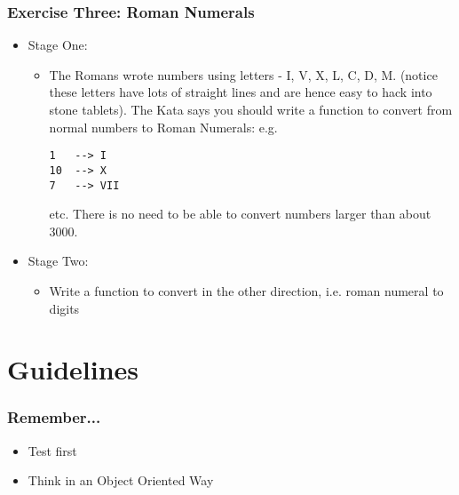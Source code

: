 \documentclass[10pt,t,sans,mathsans,xcolor=dvipsnames]{beamer}
\begin{document}
\begin{frame}[fragile]
\frametitle{Exercise Three: Roman Numerals}
\begin{itemize}
\item Stage One:
\begin{itemize}
\item The Romans wrote numbers using letters - I, V, X, L, C, D, M. (notice these letters have lots of straight lines and are hence easy to hack into stone tablets). The Kata says you should write a function to convert from normal numbers to Roman Numerals: e.g.
\begin{verbatim}
1 	--> I
10 	--> X
7 	--> VII
\end{verbatim}
etc. There is no need to be able to convert numbers larger than about 3000.
\end{itemize}
\item Stage Two:
\begin{itemize}
\item Write a function to convert in the other direction, i.e. roman numeral to digits
\end{itemize}
\end{itemize}
\end{frame}
\section{Guidelines}
\begin{frame}[fragile]%
\frametitle{Remember...}
\begin{itemize}
\item Test first
\item Think in an Object Oriented Way
\end{itemize}
\end{frame}
\end{document}
